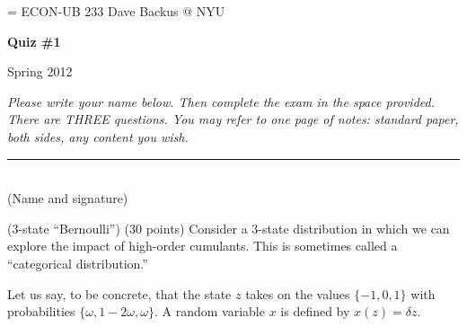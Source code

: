 \documentclass[11pt]{exam}
\begin{document}
\parskip=\bigskipamount
\parindent=0.0in
\thispagestyle{empty}
{\large ECON-UB 233 \hfill Dave Backus @ NYU}

\bigskip\bigskip
\centerline{\Large \bf Quiz \#1}
\centerline{Spring 2012}

\bigskip
{\it Please write your name below.
Then complete the exam in the space provided.
There are THREE questions.
You may refer to one page of notes:
standard paper, both sides, any content you wish.}

\bigskip
\begin{flushleft}
\rule{4in}{0.5pt} \\ (Name and signature)
\end{flushleft}


\begin{questions}
\question (3-state ``Bernoulli'') (30 points)
Consider a 3-state distribution
in which we can explore the impact of high-order cumulants.
This is sometimes called a ``categorical distribution.''

Let us say, to be concrete, that the state $z$ takes on the values
 $\{-1, 0, 1\}$ with
 probabilities $\{\omega, 1-2\omega, \omega \}$.
 A random variable $x$ is defined by $x(z) = \delta z$.



\end{questions}
\end{document}
